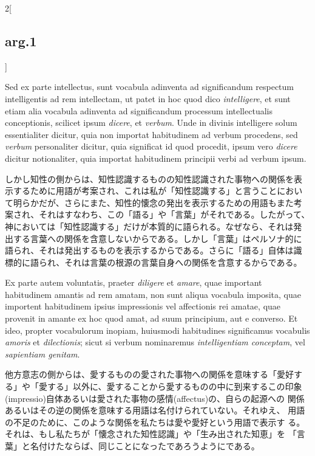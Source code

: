 \documentclass[paper=a4paper,fontsize=10pt,jafontsize=9pt,titlepage]{jlreq}
\begin{document}
\begin{paracol}{2}[\subsection{arg.1}]
\switchcolumn*

Sed ex parte
intellectus, sunt vocabula adinventa ad significandum respectum
intelligentis ad rem intellectam, ut patet in hoc quod dico
{\itshape intelligere}, et sunt etiam alia vocabula adinventa ad significandum
processum intellectualis conceptionis, scilicet ipsum {\itshape dicere}, et
{\itshape verbum}. Unde in divinis intelligere solum essentialiter dicitur, quia
non importat habitudinem ad verbum procedens, sed {\itshape verbum} personaliter
dicitur, quia significat id quod procedit, ipsum vero {\itshape dicere} dicitur
notionaliter, quia importat habitudinem principii verbi ad verbum
ipsum.

\switchcolumn

しかし知性の側からは、知性認識するものの知性認識された事物への関係を表
示するために用語が考案され、これは私が「知性認識する」と言うことにおい
て明らかだが、さらにまた、知性的懐念の発出を表示するための用語もまた考
案され、それはすなわち、この「語る」や「言葉」がそれである。したがって、
神においては「知性認識する」だけが本質的に語られる。なぜなら、それは発
出する言葉への関係を含意しないからである。しかし「言葉」はペルソナ的に
語られ、それは発出するものを表示するからである。さらに「語る」自体は識
標的に語られ、それは言葉の根源の言葉自身への関係を含意するからである。

\switchcolumn*

Ex parte autem voluntatis, praeter {\itshape diligere} et {\itshape
amare}, quae important habitudinem amantis ad rem amatam, non sunt
aliqua vocabula imposita, quae importent habitudinem ipsius
impressionis vel affectionis rei amatae, quae provenit in amante ex
hoc quod amat, ad suum principium, aut e converso. Et ideo, propter
vocabulorum inopiam, huiusmodi habitudines significamus vocabulis
{\itshape amoris} et {\itshape dilectionis}; sicut si verbum
nominaremus {\itshape intelligentiam conceptam}, vel {\itshape
sapientiam genitam}.

\switchcolumn

他方意志の側からは、愛するものの愛された事物への関係を意味する「愛好す
る」や「愛する」以外に、愛することから愛するものの中に到来するこの印象
(impressio)自体あるいは愛された事物の感情(affectus)の、自らの起源への
関係あるいはその逆の関係を意味する用語は名付けられていない。それゆえ、
用語の不足のために、このような関係を私たちは愛や愛好という用語で表示す
る。それは、もし私たちが「懐念された知性認識」や「生み出された知恵」を
「言葉」と名付けたならば、同じことになったであろうようにである。

\switchcolumn*


\end{paracol}
\end{document}
